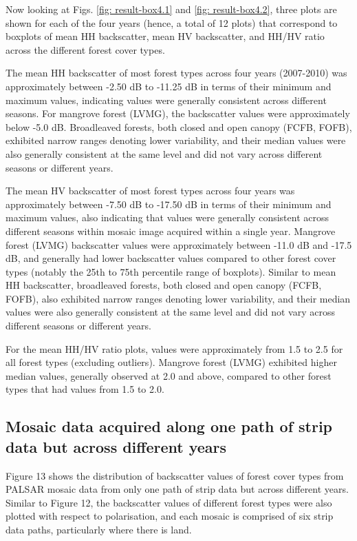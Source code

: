Now looking at Figs. \ref{fig: result-box4.1} and \ref{fig: result-box4.2}, three plots are shown for each of the four years (hence, a total of 12 plots) that correspond to boxplots of mean HH backscatter, mean HV backscatter, and HH/HV ratio across the different forest cover types.

The mean HH backscatter of most forest types across four years (2007-2010) was approximately between -2.50 dB to -11.25 dB in terms of their minimum and maximum values, indicating values were generally consistent across different seasons. For mangrove forest (LVMG), the backscatter values were approximately below -5.0 dB. Broadleaved forests, both closed and open canopy (FCFB, FOFB), exhibited narrow ranges denoting lower variability, and their median values were also generally consistent at the same level and did not vary across different seasons or different years.

The mean HV backscatter of most forest types across four years was approximately between -7.50 dB to -17.50 dB in terms of their minimum and maximum values, also indicating that values were generally consistent across different seasons within mosaic image acquired within a single year. Mangrove forest (LVMG) backscatter values were approximately between -11.0 dB and -17.5 dB, and generally had lower backscatter values compared to other forest cover types (notably the 25th to 75th percentile range of boxplots). Similar to mean HH backscatter, broadleaved forests, both closed and open canopy (FCFB, FOFB), also exhibited narrow ranges denoting lower variability, and their median values were also generally consistent at the same level and did not vary across different seasons or different years.

For the mean HH/HV ratio plots, values were approximately from 1.5 to 2.5 for all forest types (excluding outliers). Mangrove forest (LVMG) exhibited higher median values, generally observed at 2.0 and above, compared to other forest types that had values from 1.5 to 2.0.

\subsection{Mosaic data acquired along one path of strip data but across different years}

Figure 13 shows the distribution of backscatter values of forest cover types from PALSAR mosaic data from only one path of strip data but across different years. Similar to Figure 12, the backscatter values of different forest types were also plotted with respect to polarisation, and each mosaic is comprised of six strip data paths, particularly where there is land.

